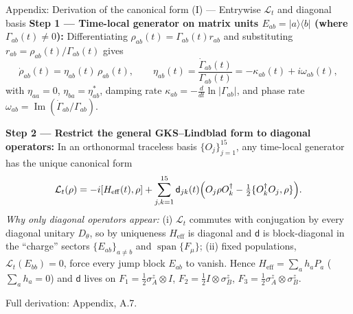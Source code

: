\documentclass[aspectratio=169,11pt]{beamer}
\newcommand{\ket}[1]{\lvert #1\rangle}
\newcommand{\bra}[1]{\langle #1\rvert}
\newcommand{\dmat}{\mathsf d}
\newcommand{\Heff}{H_{\mathrm{eff}}}
\newcommand{\appref}[1]{{\color{muted}\footnotesize Full derivation: Appendix, #1.}}
\begin{document}
\begin{frame}{Appendix: Derivation of the canonical form (I) --- Entrywise $\mathcal L_t$ and diagonal basis}
\small
\textbf{Step 1 --- Time-local generator on matrix units $E_{ab}=\ket a\bra b$ (where $\Gamma_{ab}(t)\ne0$):}
Differentiating $\rho_{ab}(t)=\Gamma_{ab}(t)r_{ab}$ and substituting $r_{ab}=\rho_{ab}(t)/\Gamma_{ab}(t)$ gives
\[
\dot\rho_{ab}(t)=\eta_{ab}(t)\,\rho_{ab}(t),\qquad
\eta_{ab}(t)=\frac{\dot\Gamma_{ab}(t)}{\Gamma_{ab}(t)}=-\kappa_{ab}(t)+i\omega_{ab}(t),
\]
with $\eta_{aa}=0$, $\eta_{ba}=\eta_{ab}^*$, damping rate $\kappa_{ab}=-\tfrac{d}{dt}\ln\lvert\Gamma_{ab}\rvert$, and phase rate $\omega_{ab}=\operatorname{Im}(\dot\Gamma_{ab}/\Gamma_{ab})$.

\textbf{Step 2 --- Restrict the general GKS--Lindblad form to diagonal operators:}
In an orthonormal traceless basis $\{O_j\}_{j=1}^{15}$, any time-local generator has the unique canonical form \cite{Hall2014}
\[
\mathcal L_t(\rho)=-i[\Heff(t),\rho]+\sum_{j,k=1}^{15}\dmat_{jk}(t)\Bigl(O_j\rho O_k^\dagger-\tfrac12\{O_k^\dagger O_j,\rho\}\Bigr).
\]
\emph{Why only diagonal operators appear:} (i) $\mathcal L_t$ commutes with conjugation by every diagonal unitary $D_\theta$, so by uniqueness $\Heff$ is diagonal and $\dmat$ is block-diagonal in the ``charge'' sectors $\{E_{ab}\}_{a\neq b}$ and $\operatorname{span}\{F_\mu\}$; (ii) fixed populations, $\mathcal L_t(E_{bb})=0$, force every jump block $E_{ab}$ to vanish. Hence $\Heff=\sum_ah_aP_a$ ($\sum_ah_a=0$) and $\dmat$ lives on
$F_1=\tfrac12\sigma_A^z\otimes I$, $F_2=\tfrac12I\otimes\sigma_B^z$, $F_3=\tfrac12\sigma_A^z\otimes\sigma_B^z$.

\appref{A.7}
\end{frame}
\end{document}
